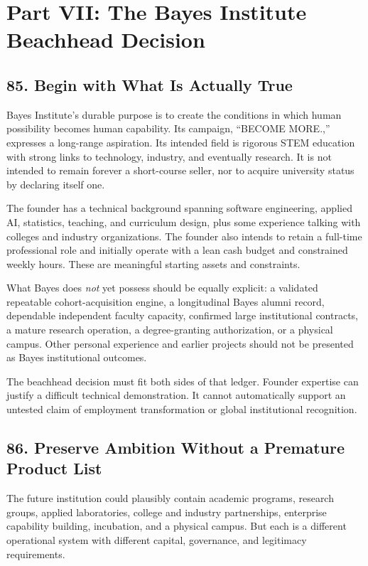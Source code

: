 \section*{Part VII: The Bayes Institute Beachhead Decision}

\subsection*{85. Begin with What Is Actually True}

Bayes Institute's durable purpose is to create the conditions in which human possibility becomes human capability. Its campaign, ``BECOME MORE.,'' expresses a long-range aspiration. Its intended field is rigorous STEM education with strong links to technology, industry, and eventually research. It is not intended to remain forever a short-course seller, nor to acquire university status by declaring itself one.

The founder has a technical background spanning software engineering, applied AI, statistics, teaching, and curriculum design, plus some experience talking with colleges and industry organizations. The founder also intends to retain a full-time professional role and initially operate with a lean cash budget and constrained weekly hours. These are meaningful starting assets and constraints.

What Bayes does \emph{not} yet possess should be equally explicit: a validated repeatable cohort-acquisition engine, a longitudinal Bayes alumni record, dependable independent faculty capacity, confirmed large institutional contracts, a mature research operation, a degree-granting authorization, or a physical campus. Other personal experience and earlier projects should not be presented as Bayes institutional outcomes.

The beachhead decision must fit both sides of that ledger. Founder expertise can justify a difficult technical demonstration. It cannot automatically support an untested claim of employment transformation or global institutional recognition.

\subsection*{86. Preserve Ambition Without a Premature Product List}

The future institution could plausibly contain academic programs, research groups, applied laboratories, college and industry partnerships, enterprise capability building, incubation, and a physical campus. But each is a different operational system with different capital, governance, and legitimacy requirements.

